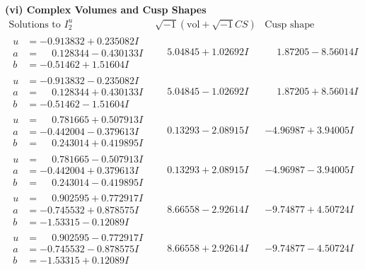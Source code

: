 \documentclass[1p]{elsarticle_modified}
\theoremstyle{definition}
\newcommand{\I}{\sqrt{-1}}
\begin{document}
\newpage\flushleft \textbf{(vi) Complex Volumes and Cusp Shapes}
$$\begin{array}{c|c|c}  
\text{Solutions to }I^u_{2}& \I (\text{vol} + \sqrt{-1}CS) & \text{Cusp shape}\\
 \hline 
\begin{aligned}
u &= -0.913832 + 0.235082 I \\
a &= \phantom{-}0.128344 - 0.430133 I \\
b &= -0.51462 + 1.51604 I\end{aligned}
 & \phantom{-}5.04845 + 1.02692 I & \phantom{-}1.87205 - 8.56014 I \\ \hline\begin{aligned}
u &= -0.913832 - 0.235082 I \\
a &= \phantom{-}0.128344 + 0.430133 I \\
b &= -0.51462 - 1.51604 I\end{aligned}
 & \phantom{-}5.04845 - 1.02692 I & \phantom{-}1.87205 + 8.56014 I \\ \hline\begin{aligned}
u &= \phantom{-}0.781665 + 0.507913 I \\
a &= -0.442004 - 0.379613 I \\
b &= \phantom{-}0.243014 + 0.419895 I\end{aligned}
 & \phantom{-}0.13293 - 2.08915 I & -4.96987 + 3.94005 I \\ \hline\begin{aligned}
u &= \phantom{-}0.781665 - 0.507913 I \\
a &= -0.442004 + 0.379613 I \\
b &= \phantom{-}0.243014 - 0.419895 I\end{aligned}
 & \phantom{-}0.13293 + 2.08915 I & -4.96987 - 3.94005 I \\ \hline\begin{aligned}
u &= \phantom{-}0.902595 + 0.772917 I \\
a &= -0.745532 + 0.878575 I \\
b &= -1.53315 - 0.12089 I\end{aligned}
 & \phantom{-}8.66558 - 2.92614 I & -9.74877 + 4.50724 I \\ \hline\begin{aligned}
u &= \phantom{-}0.902595 - 0.772917 I \\
a &= -0.745532 - 0.878575 I \\
b &= -1.53315 + 0.12089 I\end{aligned}
 & \phantom{-}8.66558 + 2.92614 I & -9.74877 - 4.50724 I \\ \hline\begin{aligned}

\end{aligned}
\end{array}$$
\end{document}
